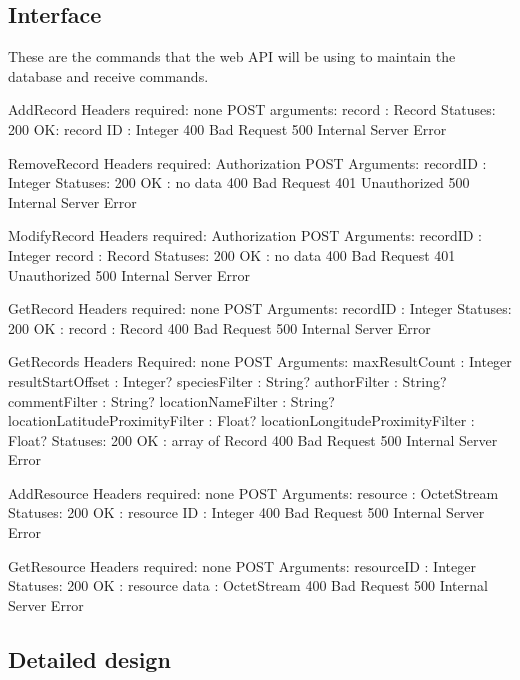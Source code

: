 \subsection{Interface}
These are the commands that the web API will be using to maintain the database and receive commands.

AddRecord
Headers required: 
    none
POST arguments:
    record : Record
Statuses:
	200 OK:
		record ID : Integer
	400 Bad Request
	500 Internal Server Error


RemoveRecord
Headers required: 
	Authorization
POST Arguments:
	recordID : Integer
Statuses:
	200 OK : no data
	400 Bad Request
	401 Unauthorized
	500 Internal Server Error


ModifyRecord
Headers required:
	Authorization
POST Arguments:
	recordID : Integer
	record : Record
Statuses:
	200 OK : no data
	400 Bad Request
	401 Unauthorized
	500 Internal Server Error


GetRecord
Headers required: 
    none
POST Arguments:
	recordID : Integer
Statuses:
	200 OK :
        record : Record
	400 Bad Request
	500 Internal Server Error


GetRecords
Headers Required:
	none
POST Arguments:
    maxResultCount : Integer
    resultStartOffset : Integer?
	speciesFilter : String?
    authorFilter : String?
    commentFilter : String?
    locationNameFilter : String?
    locationLatitudeProximityFilter : Float?
    locationLongitudeProximityFilter : Float?
Statuses: 
	200 OK : array of Record
	400 Bad Request
	500 Internal Server Error

AddResource
Headers required: 
    none
POST Arguments:
	resource : OctetStream
Statuses:
	200 OK :
		resource ID : Integer
	400 Bad Request
	500 Internal Server Error


GetResource
Headers required:
    none
POST Arguments:
	resourceID : Integer
Statuses:
	200 OK : 
        resource data : OctetStream
	400 Bad Request
	500 Internal Server Error

\subsection{Detailed design}
